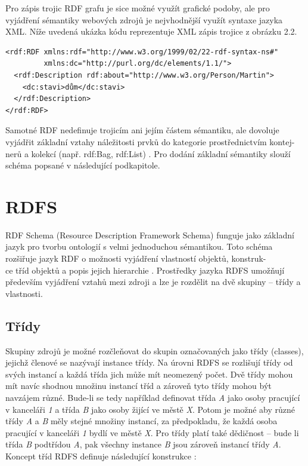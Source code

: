 \documentclass{projekt}
\begin{document}
Pro zápis trojic RDF grafu je sice možné využít grafické podoby, ale pro vyjádření sémantiky webových zdrojů je nejvhodnější využít syntaxe jazyka XML. Níže uvedená ukázka kódu reprezentuje XML zápis trojice z obrázku 2.2.

\begin{verbatim}
<rdf:RDF xmlns:rdf="http://www.w3.org/1999/02/22-rdf-syntax-ns#"
         xmlns:dc="http://purl.org/dc/elements/1.1/">
  <rdf:Description rdf:about="http://www.w3.org/Person/Martin">
    <dc:stavi>dům</dc:stavi>
  </rdf:Description>
</rdf:RDF>

\end{verbatim}

Samotné RDF nedefinuje trojicím ani jejím částem sémantiku, ale dovoluje vyjádřit základní vztahy náležitosti prvků do kategorie prostřednictvím kontej-\\nerů a kolekcí (např. rdf:Bag, rdf:List) \cite{_2}. Pro dodání základní sémantiky slouží schéma popsané v následující podkapitole.

\section{RDFS}
\hspace{0.65cm}RDF Schema (Resource Description Framework Schema) funguje jako základní jazyk pro tvorbu ontologií s velmi jednoduchou sémantikou. Toto schéma rozšiřuje jazyk RDF o možnosti vyjádření vlastností objektů, konstruk-\\ce tříd objektů a popis jejich hierarchie \cite{_2}. 
Prostředky jazyka RDFS umožňují především vyjádření vztahů mezi zdroji a lze je rozdělit na dvě skupiny – třídy a vlastnosti.

\subsection{Třídy}
Skupiny zdrojů je možné rozčleňovat do skupin označovaných jako třídy (classes), jejichž členové se nazývají instance třídy. Na úrovni RDFS se rozlišují třídy od svých instancí a každá třída jich může mít neomezený počet. Dvě třídy mohou mít navíc shodnou množinu instancí tříd a zároveň tyto třídy mohou být navzájem různé. Bude-li se tedy například definovat třída {\it A} jako osoby pracující v kanceláři {\it 1} a třída {\it B} jako osoby žijící ve městě {\it X}. Potom je možné aby různé třídy {\it A} a {\it B} měly stejné množiny instancí, za předpokladu, že každá osoba pracující v kanceláři {\it 1} bydlí ve městě {\it X}. Pro třídy platí také dědičnost – bude li třída {\it B} podtřídou {\it A}, pak všechny instance {\it B} jsou zároveň instancí třídy {\it A}. Koncept tříd RDFS definuje následující konstrukce \cite{_7}:
\end{document}
